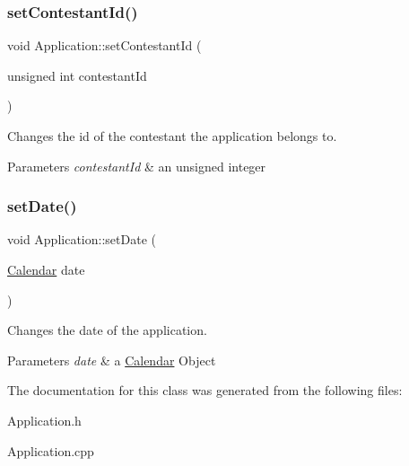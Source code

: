 \subsubsection{\texorpdfstring{set\+Contestant\+Id()}{setContestantId()}}
{\footnotesize\ttfamily void Application\+::set\+Contestant\+Id (\begin{DoxyParamCaption}\item[{unsigned int}]{contestant\+Id }\end{DoxyParamCaption})}



Changes the id of the contestant the application belongs to. 


\begin{DoxyParams}{Parameters}
{\em contestant\+Id} & an unsigned integer \\
\hline
\end{DoxyParams}
\mbox{\label{class_application_acc2019632c740b9384cf66e653c9b1de}} 
\subsubsection{\texorpdfstring{set\+Date()}{setDate()}}
{\footnotesize\ttfamily void Application\+::set\+Date (\begin{DoxyParamCaption}\item[{\hyperlink{class_calendar}{Calendar}}]{date }\end{DoxyParamCaption})}



Changes the date of the application. 


\begin{DoxyParams}{Parameters}
{\em date} & a \hyperlink{class_calendar}{Calendar} Object \\
\hline
\end{DoxyParams}


The documentation for this class was generated from the following files\+:\begin{DoxyCompactItemize}
\item 
Application.\+h\item 
Application.\+cpp\end{DoxyCompactItemize}
